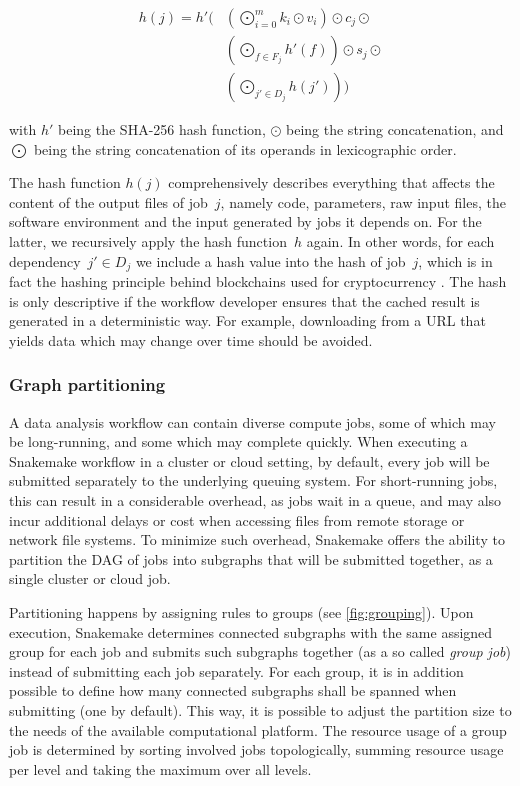 \documentclass[10pt,a4paper,twocolumn]{article}
\begin{document}
\begin{align*}
h(j) = h'\Bigg( &\left(\bigodot_{i=0}^m k_i \odot v_i \right) \odot c_j \odot \\
&\left( \bigodot_{f \in F_j} h'(f) \right) \odot s_j \odot \\
&\left( \bigodot_{j' \in D_j} h(j') \right) \Bigg)
\end{align*}

with $h'$ being the SHA-256 \parencite{Handschuh} hash function, $\odot$ being the string concatenation, and $\bigodot$ being the string concatenation of its operands in lexicographic order.

The hash function $h(j)$ comprehensively describes everything that affects the content of the output files of job~\(j\), namely code, parameters, raw input files, the software environment and the input generated by jobs it depends on.
For the latter, we recursively apply the hash function~\(h\) again.
In other words, for each dependency~\(j' \in D_j\) we include a hash value into the hash of job~\(j\), which is in fact the hashing principle behind blockchains used for cryptocurrency \parencite{narayanan_bitcoin_2016}.
The hash is only descriptive if the workflow developer ensures that the cached result is generated in a deterministic way.
For example, downloading from a URL that yields data which may change over time should be avoided.

\subsubsection{Graph partitioning}\label{sec:partitioning}

A data analysis workflow can contain diverse compute jobs, some of which may be long-running, and some which may complete quickly.
When executing a Snakemake workflow in a cluster or cloud setting, by default, every job will be submitted separately to the underlying queuing system.
For short-running jobs, this can result in a considerable overhead, as jobs wait in a queue, and may also incur additional delays or cost when accessing files from remote storage or network file systems.
To minimize such overhead, Snakemake offers the ability to partition the DAG of jobs into subgraphs that will be submitted together, as a single cluster or cloud job.

Partitioning happens by assigning rules to groups (see \autoref{fig:grouping}).
Upon execution, Snakemake determines connected subgraphs with the same assigned group for each job and submits such subgraphs together (as a so called \emph{group job}) instead of submitting each job separately.
For each group, it is in addition possible to define how many connected subgraphs shall be spanned when submitting (one by default).
This way, it is possible to adjust the partition size to the needs of the available computational platform.
The resource usage of a group job is determined by sorting involved jobs topologically, summing resource usage per level and taking the maximum over all levels.
\end{document}
